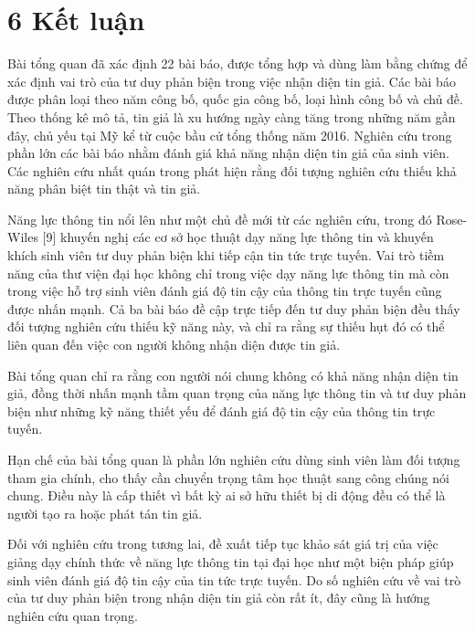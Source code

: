 \section{6 Kết luận}

Bài tổng quan đã xác định 22 bài báo, được tổng hợp và dùng làm bằng chứng để xác định vai trò của tư duy phản biện trong việc nhận diện tin giả. Các bài báo được phân loại theo năm công bố, quốc gia công bố, loại hình công bố và chủ đề. Theo thống kê mô tả, tin giả là xu hướng ngày càng tăng trong những năm gần đây, chủ yếu tại Mỹ kể từ cuộc bầu cử tổng thống năm 2016. Nghiên cứu trong phần lớn các bài báo nhằm đánh giá khả năng nhận diện tin giả của sinh viên. Các nghiên cứu nhất quán trong phát hiện rằng đối tượng nghiên cứu thiếu khả năng phân biệt tin thật và tin giả.

Năng lực thông tin nổi lên như một chủ đề mới từ các nghiên cứu, trong đó Rose-Wiles {[}9{]} khuyến nghị các cơ sở học thuật dạy năng lực thông tin và khuyến khích sinh viên tư duy phản biện khi tiếp cận tin tức trực tuyến. Vai trò tiềm năng của thư viện đại học không chỉ trong việc dạy năng lực thông tin mà còn trong việc hỗ trợ sinh viên đánh giá độ tin cậy của thông tin trực tuyến cũng được nhấn mạnh. Cả ba bài báo đề cập trực tiếp đến tư duy phản biện đều thấy đối tượng nghiên cứu thiếu kỹ năng này, và chỉ ra rằng sự thiếu hụt đó có thể liên quan đến việc con người không nhận diện được tin giả.

Bài tổng quan chỉ ra rằng con người nói chung không có khả năng nhận diện tin giả, đồng thời nhấn mạnh tầm quan trọng của năng lực thông tin và tư duy phản biện như những kỹ năng thiết yếu để đánh giá độ tin cậy của thông tin trực tuyến.

Hạn chế của bài tổng quan là phần lớn nghiên cứu dùng sinh viên làm đối tượng tham gia chính, cho thấy cần chuyển trọng tâm học thuật sang công chúng nói chung. Điều này là cấp thiết vì bất kỳ ai sở hữu thiết bị di động đều có thể là người tạo ra hoặc phát tán tin giả.

Đối với nghiên cứu trong tương lai, đề xuất tiếp tục khảo sát giá trị của việc giảng dạy chính thức về năng lực thông tin tại đại học như một biện pháp giúp sinh viên đánh giá độ tin cậy của tin tức trực tuyến. Do số nghiên cứu về vai trò của tư duy phản biện trong nhận diện tin giả còn rất ít, đây cũng là hướng nghiên cứu quan trọng.
